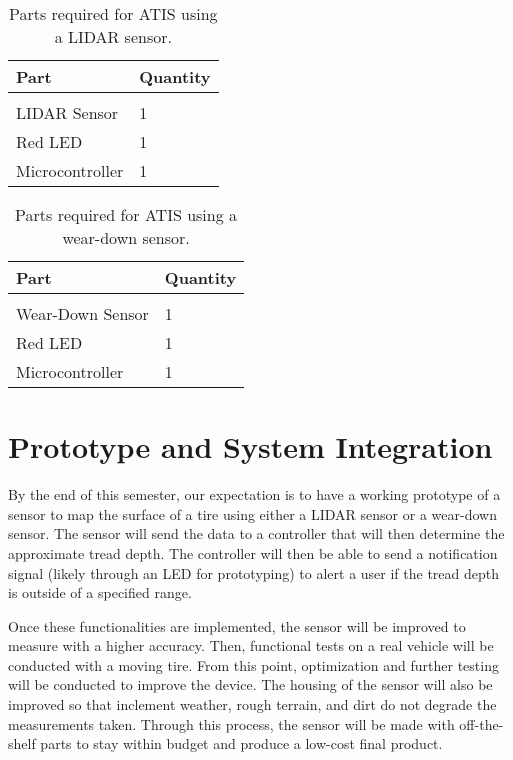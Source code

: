 \documentclass[11pt]{IEEEtran}
\begin{document}
		\begin{table}[b]
			\begin{center}
				\caption{Parts required for ATIS using a LIDAR sensor.}
				\label{tab:lidarTable}
				\begin{tabular}{l|l}
					Part 			& Quantity  \\
					\hline
					\vspace{-0.1in}	&	\\
					LIDAR Sensor 	& 1 \\
					Red LED 		& 1 \\
					Microcontroller	& 1 
				\end{tabular}
			\end{center}
		\end{table}

		\begin{table}[b]
			\begin{center}
				\caption{Parts required for ATIS using a wear-down sensor.}
				\label{tab:wearDownTable}
				\begin{tabular}{l|l}
					Part 				& Quantity  \\
					\hline
					\vspace{-0.1in}		&	\\
					Wear-Down Sensor 	& 1 \\
					Red LED 			& 1 \\
					Microcontroller 	& 1
				\end{tabular}
			\end{center}
		\end{table}

	\section{Prototype and System Integration}
		By the end of this semester, our expectation is to have a working prototype of a sensor to map the surface of a tire using either a LIDAR sensor or a wear-down sensor. The sensor will send the data to a controller that will then determine the approximate tread depth. The controller will then be able to send a notification signal (likely through an LED for prototyping) to alert a user if the tread depth is outside of a specified range. 

		Once these functionalities are implemented, the sensor will be improved to measure with a higher accuracy. Then, functional tests on a real vehicle will be conducted with a moving tire. From this point, optimization and further testing will be conducted to improve the device. The housing of the sensor will also be improved so that inclement weather, rough terrain, and dirt do not degrade the measurements taken. Through this process, the sensor will be made with off-the-shelf parts to stay within budget and produce a low-cost final product. 
\end{document}
